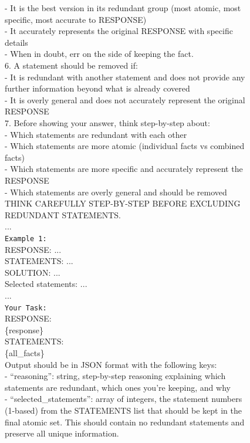 \documentclass{article}
\begin{document}
\begin{figure}[t!]
\begin{small}
\begin{tcolorbox}[
    colback=gray!5,
    colframe=black,
    width=\linewidth,
    arc=2mm,
    boxrule=0.5pt,
    title=\textbf{Atomic Fact Generation (Step 5): Redundancy Filtering Prompt}
]
   - It is the best version in its redundant group (most atomic, most specific, most accurate to RESPONSE)\\
   - It accurately represents the original RESPONSE with specific details\\
   - When in doubt, err on the side of keeping the fact.\\
6. A statement should be removed if:\\
   - It is redundant with another statement and does not provide any further information beyond what is already covered\\
   - It is overly general and does not accurately represent the original RESPONSE\\
7. Before showing your answer, think step-by-step about:\\
   - Which statements are redundant with each other\\
   - Which statements are more atomic (individual facts vs combined facts)\\
   - Which statements are more specific and accurately represent the RESPONSE\\
   - Which statements are overly general and should be removed\\
   
THINK CAREFULLY STEP-BY-STEP BEFORE EXCLUDING REDUNDANT STATEMENTS. \\
...\\

\texttt{Example 1:}\\
RESPONSE: ...\\
STATEMENTS: ...\\
SOLUTION: ...\\
Selected statements: ...\\
...\\

\texttt{Your Task:}\\
RESPONSE:\\
\{response\}\\
STATEMENTS:\\
\{all\_facts\}\\

Output should be in JSON format with the following keys:\\
- ``reasoning'': string, step-by-step reasoning explaining which statements are redundant, which ones you're keeping, and why\\
- ``selected\_statements'': array of integers, the statement numbers (1-based) from the STATEMENTS list that should be kept in the final atomic set. This should contain no redundant statements and preserve all unique information.
\end{tcolorbox}


\end{small}
\end{figure}
\end{document}
